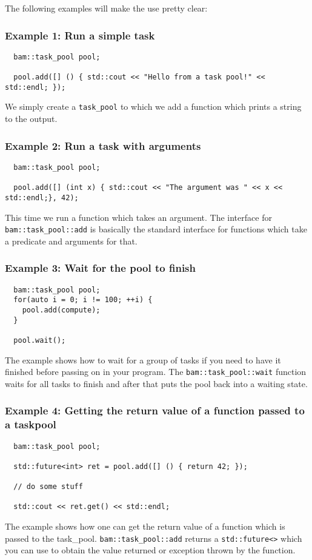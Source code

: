 \documentclass[11pt, a4paper]{article}
\begin{document}
The following examples will make the use pretty clear:

\subsubsection{Example 1: Run a simple task}

\begin{lstlisting}
  bam::task_pool pool;

  pool.add([] () { std::cout << "Hello from a task pool!" << std::endl; });

\end{lstlisting}

We simply create a \texttt{task\_pool} to which we add a function which prints a string to the output. 

\subsubsection{Example 2: Run a task with arguments}
\begin{lstlisting}
  bam::task_pool pool;

  pool.add([] (int x) { std::cout << "The argument was " << x << std::endl;}, 42);
\end{lstlisting}
This time we run a function which takes an argument. The interface for \texttt{bam::task\_pool::add} is basically the standard interface for functions which take a predicate and arguments for that. 

\subsubsection{Example 3: Wait for the pool to finish}
\begin{lstlisting}
  bam::task_pool pool;
  for(auto i = 0; i != 100; ++i) {
    pool.add(compute);
  }

  pool.wait();
\end{lstlisting}
The example shows how to wait for a group of tasks if you need to have it finished before passing on in your program. The \texttt{bam::task\_pool::wait} function waits for all tasks to finish and after that puts the pool back into a waiting state.

\subsubsection{Example 4: Getting the return value of a function passed to a taskpool}
\begin{lstlisting}
  bam::task_pool pool;

  std::future<int> ret = pool.add([] () { return 42; });

  // do some stuff

  std::cout << ret.get() << std::endl;

\end{lstlisting}
The example shows how one can get the return value of a function which is passed to the task\_pool. \texttt{bam::task\_pool::add} returns a \texttt{std::future<>} which you can use to obtain the value returned or exception thrown by the function. 
\end{document}
